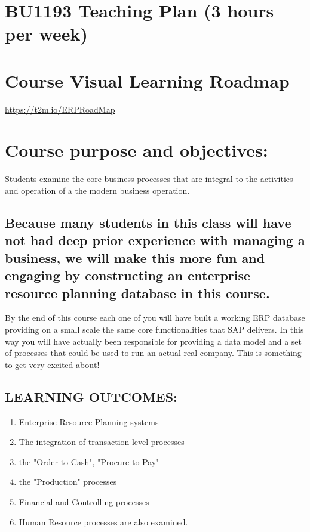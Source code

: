 \section * {BU1193 Teaching Plan (3 hours per week)}
\section * {Course Visual Learning Roadmap}
\url{https://t2m.io/ERPRoadMap}
\section * {Course purpose and objectives: }

Students examine the core business processes that are integral to the activities and operation of a the modern business operation.

\subsection * {Because many students in this class will have not had deep prior experience with managing a business, we will make this more fun and engaging by constructing an enterprise resource planning database in this course.}  
 
By the end of this course each one of you will have built a working ERP database providing on a small scale the same core functionalities that SAP delivers.
\newline
In this way you will have actually been responsible for providing a data model and a set of processes that could be used to run an actual real company.
\newline
This is something to get very excited about!

\subsection * {LEARNING OUTCOMES:}
\begin{enumerate}
    \item Enterprise Resource Planning systems
    \item The integration of transaction level processes
    \item the "Order-to-Cash", "Procure-to-Pay"
    \item the "Production" processes
    \item Financial and Controlling processes
    \item Human Resource processes are also examined. 
\end{enumerate}

